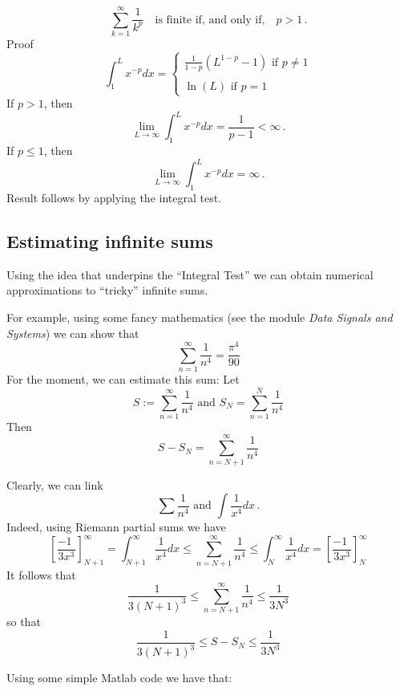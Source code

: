 \documentclass{article}
\begin{document}
$$
\sum_{k=1}^\infty \frac{1}{k^p} \quad \mbox{is finite if, and only if,} \quad p > 1\,.
$$
Proof
$$
\int_1^L x^{-p} dx = 
\left\{ \begin{array}{l} 
\frac{1}{1-p} \left( L^{1-p} - 1\right) \mbox{ if } p \neq 1\\ 
\\
\ln(L) \mbox{ if } p = 1
\end{array} \right.
$$
If $p > 1$, then 
$$
\lim_{L \rightarrow \infty} \int_1^L x^{-p} dx = \frac{1}{p-1} < \infty\,.
$$
If $p \leq 1$, then
$$
\lim_{L \rightarrow \infty} \int_1^L x^{-p} dx = \infty\,.
$$
Result follows by applying the integral test.


\subsection{Estimating infinite sums}

Using the idea that underpins the ``Integral Test'' we can obtain numerical approximations to
``tricky'' infinite sums. 

For example, using some fancy mathematics (see the module \textit{Data Signals and Systems}) we can show that
$$
\sum_{n=1}^\infty \frac{1}{n^4}= \frac{\pi^4}{90}
$$
For the moment, we can estimate this sum: Let
$$
S := \sum_{n=1}^\infty \frac{1}{n^4} \mbox{   and   } S_N = \sum_{n=1}^N \frac{1}{n^4}
$$
Then 
$$
S-S_N = \sum_{n=N+1}^\infty \frac{1}{n^4}
$$


Clearly, we can link
$$
\sum \frac{1}{n^4} \mbox{   and   } \int \frac{1}{x^4} dx\,.
$$
Indeed, using Riemann partial sums we have
$$
\left[ \frac{-1\,\,}{3 x^3} \right]_{N+1}^\infty = \int_{N+1}^\infty \frac{1}{x^4} dx \leq \sum_{n=N+1}^\infty \frac{1}{n^4} \leq  \int_N^\infty \frac{1}{x^4} dx = \left[ \frac{-1\,\,}{3 x^3} \right]_{N}^\infty 
$$
It follows that
$$
 \frac{1}{3(N+1)^3} \leq \sum_{n=N+1}^\infty \frac{1}{n^4} \leq  \frac{1}{3N^3}
 $$
 so that 
 $$
 \frac{1}{3(N+1)^3} \leq S-S_N \leq  \frac{1}{3N^3}
 $$


Using some simple Matlab code we have that:
%


%
\end{document}
